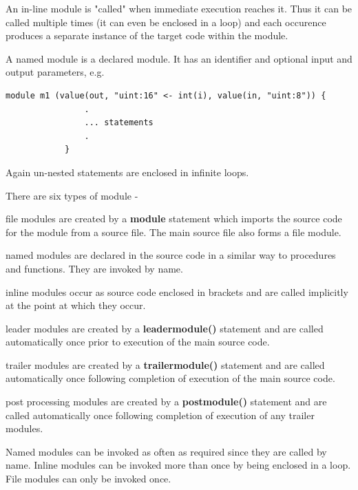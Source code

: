         An in-line module is "called" when immediate execution reaches it. Thus
        it can be called multiple times (it can even be enclosed in a loop)
        and each occurence produces a separate instance of the target code
        within the module.
        
        A named module is a declared module. It has an identifier and optional
        input and output parameters, e.g.
        \begin{lstlisting}[gobble=12, language=threepl]           
            module m1 (value(out, "uint:16" <- int(i), value(in, "uint:8")) {
                .
                ... statements
                .
            }
        \end{lstlisting}
        Again un-nested statements are enclosed in infinite loops.
        
    

        
        There are six types of module -
        \blist
        \item   file modules are created by a {\bf module} statement which imports
                the source code for the module from a source file. The main
                source file also forms a file module.
        \item   named modules are declared in the source code in a similar way
                to procedures and functions. They are invoked by name.
        \item   inline modules occur as source code enclosed in brackets and are
                called implicitly at the point at which they occur.
        \item   leader modules are created by a {\bf leadermodule()} statement
                and are called automatically once prior to execution of the main
                source code.
        \item   trailer modules are created by a {\bf trailermodule()} statement
                and are called automatically once following completion of
                execution of the main source code.
        \item   post processing modules are created by a {\bf postmodule()}
                statement and are called automatically once following completion
                of execution of any trailer modules.
        \blend
        
        Named modules can be invoked as often as required since they are called
        by name. Inline modules can be invoked more than once
        by being enclosed in a loop. File modules can only be invoked once.

